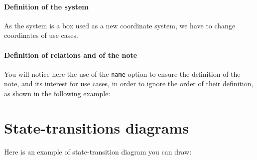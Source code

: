 \documentclass[a4paper,11pt]{report}
\begin{document}
\begin{center}
\end{center}

\subsubsection{Definition of the system}

As the system is a box used as a new coordinate system, we have to change coordinates of use cases.

	{\color{red!70!black}
		\vspace{-0.4cm}
	}
\vspace{-0.4cm}
{\color{red!70!black}
	\vspace{-0.4cm}
}


\begin{center}
\end{center}

\subsubsection{Definition of relations and of the note}

You will notice here the use of the {\tt name} option to ensure the definition of the note, and its interest for use cases, in order to ignore the order of their definition, as shown in the following example:

\vspace{-0.4cm}
{\color{red!70!black}
	
}

\begin{center}
\end{center}

\chapter{State-transitions diagrams}\label{c.statetrans}

Here is an example of state-transition diagram you can draw:
\end{document}
